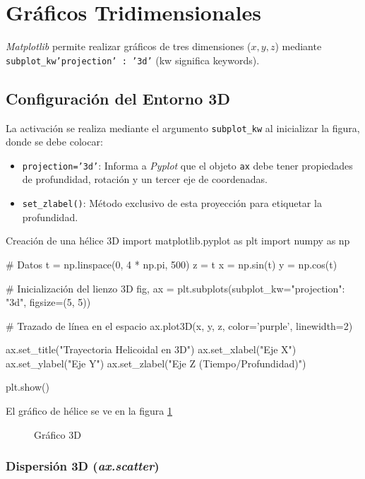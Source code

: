 \section{Gráficos Tridimensionales}

\textit{Matplotlib} permite realizar gráficos de tres dimensiones (\(x,y,z\)) mediante \texttt{subplot\_kw{'projection' : '3d'}} (kw significa keywords). 

\subsection{Configuración del Entorno 3D}

La activación se realiza mediante el argumento \texttt{subplot\_kw} al inicializar la figura, donde se debe colocar:
\begin{itemize}
\item \texttt{projection='3d'}: Informa a \textit{Pyplot} que el objeto \texttt{ax} debe tener propiedades de profundidad, rotación y un tercer eje de coordenadas.
\item \texttt{set\_zlabel()}: Método exclusivo de esta proyección para etiquetar la profundidad.
\end{itemize}

\begin{pycode}{Creación de una hélice 3D}
import matplotlib.pyplot as plt
import numpy as np

# Datos
t = np.linspace(0, 4 * np.pi, 500)
z = t
x = np.sin(t)
y = np.cos(t)

# Inicialización del lienzo 3D
fig, ax = plt.subplots(subplot_kw={"projection": "3d"}, figsize=(5, 5)) 

# Trazado de línea en el espacio
ax.plot3D(x, y, z, color='purple', linewidth=2)

ax.set_title("Trayectoria Helicoidal en 3D")
ax.set_xlabel("Eje X")
ax.set_ylabel("Eje Y")
ax.set_zlabel("Eje Z (Tiempo/Profundidad)")

plt.show()
\end{pycode}

El gráfico de hélice se ve en la figura \ref{fig:grafico_Tridimensional}

\begin{figure}[ht]
    \centering
     
    \caption{Gráfico 3D}
    \label{fig:grafico_Tridimensional}
\end{figure}

\subsubsection{Dispersión 3D (\textit{ax.scatter})}

